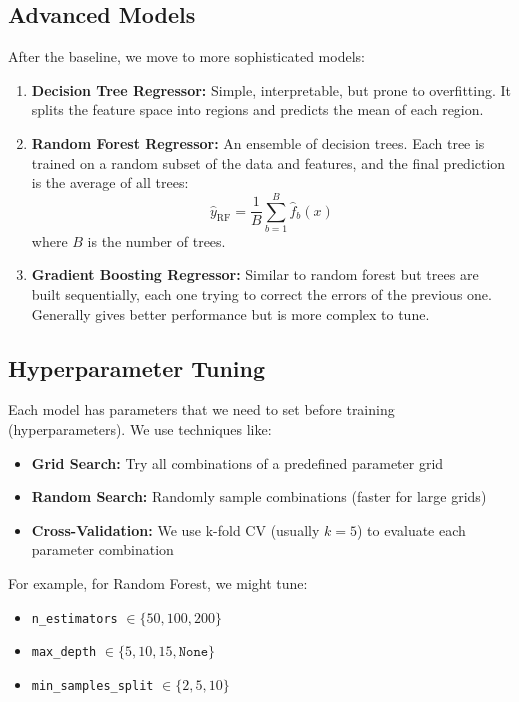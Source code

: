 \documentclass[12pt, a4paper]{article}
\begin{document}
\subsection{Advanced Models}

After the baseline, we move to more sophisticated models:

\begin{enumerate}
    \item \textbf{Decision Tree Regressor:} Simple, interpretable, but prone to overfitting. It splits the feature space into regions and predicts the mean of each region.
    
    \item \textbf{Random Forest Regressor:} An ensemble of decision trees. Each tree is trained on a random subset of the data and features, and the final prediction is the average of all trees:
    $$\hat{y}_{\text{RF}} = \frac{1}{B} \sum_{b=1}^{B} \hat{f}_b(x)$$
    where $B$ is the number of trees.
    
    \item \textbf{Gradient Boosting Regressor:} Similar to random forest but trees are built sequentially, each one trying to correct the errors of the previous one. Generally gives better performance but is more complex to tune.
\end{enumerate}

\subsection{Hyperparameter Tuning}

Each model has parameters that we need to set before training (hyperparameters). We use techniques like:

\begin{itemize}
    \item \textbf{Grid Search:} Try all combinations of a predefined parameter grid
    \item \textbf{Random Search:} Randomly sample combinations (faster for large grids)
    \item \textbf{Cross-Validation:} We use k-fold CV (usually $k=5$) to evaluate each parameter combination
\end{itemize}

For example, for Random Forest, we might tune:
\begin{itemize}
    \item \texttt{n\_estimators} $\in \{50, 100, 200\}$
    \item \texttt{max\_depth} $\in \{5, 10, 15, \texttt{None}\}$
    \item \texttt{min\_samples\_split} $\in \{2, 5, 10\}$
\end{itemize}
\end{document}
